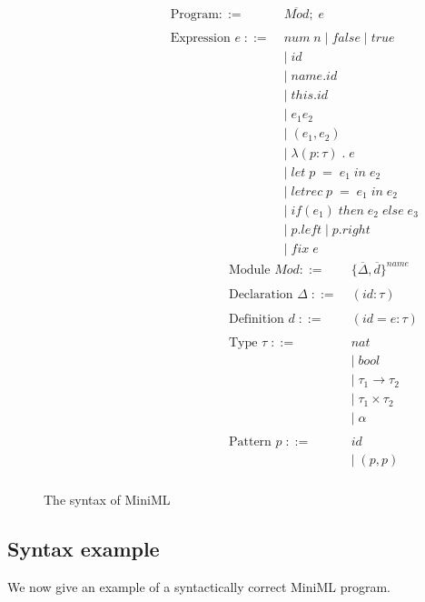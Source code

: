 \documentclass[10pt,a4paper,draft]{article}
\begin{document}
\begin{flushleft}
\begin{figure}[!htbp]
\begin{align*}
\begin{aligned}
\text{Program} ::= \; & \overline{\mathit{Mod}};\;e\\
\\
\text{Expression }e \; ::= \; &\mathit{num \; n \;} | \; \mathit{false} \; | \; \mathit{true} \\
&|\;\mathit{id}  \\
&|\;\mathit{name.id} \\
&|\;\mathit{this.id} \\
&|\;e_{1}e_{2} \\
&|\;(e_{1},e_{2}) \\
&|\;\lambda(p:\tau)\;.\;e \\
&|\;\mathit{let }\; p \; = \; e_{1} \; in \; e_{2} \\
&|\;\mathit{letrec} \; p \; = \; e_{1} \; in \; e_{2} \\
&|\; \mathit{if(e_{1}) \; then \; e_{2} \; else \; e_{3}}\\
&|\;\mathit{p.left}\; | \; \mathit{p.right} \\
&|\;\mathit{fix\;e}
\end{aligned}
\begin{aligned}
\text{Module } \mathit{Mod} ::= \; &\lbrace \overline{\Delta}, \overline{\mathit{d}}\rbrace^{name}\\ 
\\
\text{Declaration } \Delta \; ::=\; & (\mathit{id}:\tau)\\ 
\\
\text{Definition } d \; ::= \; &(\mathit{id}=e:\tau)\\
\\
\text{Type }\tau \; ::= \; &nat \\
&| \; \mathit{bool} \\
&| \; \tau_{1} \rightarrow \tau_{2} \\
&| \; \tau_{1} \times \tau_{2} \\
&| \; \alpha\\
\\
\text{Pattern }p \; ::= \; & \mathit{id} \\
&| \; (p,p)\\
\end{aligned}
\end{align*}
\caption{The syntax of MiniML}
\end{figure}

\subsection{Syntax example}
We now give an example of a syntactically correct MiniML program.


\end{flushleft}
\end{document}
